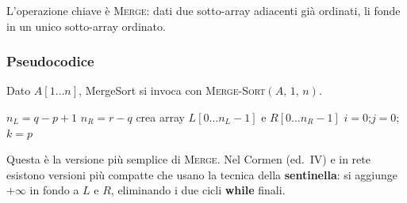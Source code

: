 L'operazione chiave è \textsc{Merge}: dati due sotto-array adiacenti già
ordinati, li fonde in un unico sotto-array ordinato.

\subsubsection{Pseudocodice}

Dato $A[1 \ldots n]$, MergeSort si invoca con
\textsc{Merge-Sort}$(A,\, 1,\, n)$.

\begin{algorithm}[H]
	\caption{\textsc{Merge-Sort}$(A, p, r)$}
	\BlankLine
\end{algorithm}

\begin{algorithm}[H]
	\caption{\textsc{Merge}$(A, p, q, r)$}
	\BlankLine
	$n_L = q - p + 1$\;
	$n_R = r - q$\;
	crea array $L[0 \ldots n_L-1]$ e $R[0 \ldots n_R-1]$\;
	\BlankLine
	\BlankLine
	$i = 0$;\quad $j = 0$;\quad $k = p$\;
	\BlankLine
	\BlankLine
\end{algorithm}

\begin{nota}
	Questa è la versione più semplice di \textsc{Merge}. Nel Cormen (ed.\ IV)
	e in rete esistono versioni più compatte che usano la tecnica della
	\textbf{sentinella}: si aggiunge $+\infty$ in fondo a $L$ e $R$,
	eliminando i due cicli \textbf{while} finali.
\end{nota}

